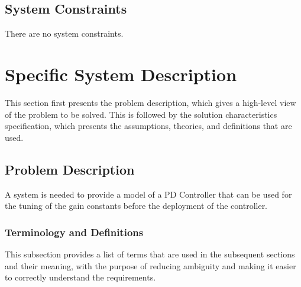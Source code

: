 \documentclass[12pt]{article}
\begin{document}
\subsection{System Constraints}
\label{Sec:SysConstraints}
There are no system constraints.

\section{Specific System Description}
\label{Sec:SpecSystDesc}
This section first presents the problem description, which gives a high-level view of the problem to be solved. This is followed by the solution characteristics specification, which presents the assumptions, theories, and definitions that are used.

\subsection{Problem Description}
\label{Sec:ProbDesc}
A system is needed to provide a model of a PD Controller  that can be used for the tuning of the gain constants before  the deployment of the controller.

\subsubsection{Terminology and Definitions}
\label{Sec:TermDefs}
This subsection provides a list of terms that are used in the subsequent sections and their meaning, with the purpose of reducing ambiguity and making it easier to correctly understand the requirements.
\end{document}
